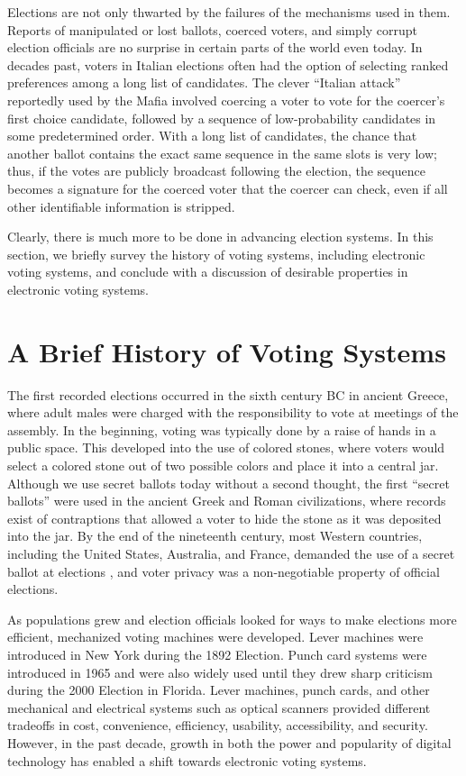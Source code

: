 Elections are not only thwarted by the failures of the mechanisms used in them. Reports of manipulated or lost ballots, coerced voters, and simply corrupt election officials are no surprise in certain parts of the world even today. In decades past, voters in Italian elections often had the option of selecting ranked preferences among a long list of candidates. The clever ``Italian attack'' \cite{naish:italian-attack} reportedly used by the Mafia involved coercing a voter to vote for the coercer's first choice candidate, followed by a sequence of low-probability candidates in some predetermined order. With a long list of candidates, the chance that another ballot contains the exact same sequence in the same slots is very low; thus, if the votes are publicly broadcast following the election, the sequence becomes a signature for the coerced voter that the coercer can check, even if all other identifiable information is stripped.

Clearly, there is much more to be done in advancing election systems. In this section, we briefly survey the history of voting systems, including electronic voting systems, and conclude with a discussion of desirable properties in electronic voting systems.

\section{A Brief History of Voting Systems} \label{intro:history}

The first recorded elections occurred in the sixth century BC in ancient Greece, where adult males were charged with the responsibility to vote at meetings of the assembly. In the beginning, voting was typically done by a raise of hands in a public space. This developed into the use of colored stones, where voters would select a colored stone out of two possible colors and place it into a central jar. Although we use secret ballots today without a second thought, the first ``secret ballots'' were used in the ancient Greek and Roman civilizations, where records exist of contraptions that allowed a voter to hide the stone as it was deposited into the jar. By the end of the nineteenth century, most Western countries, including the United States, Australia, and France, demanded the use of a secret ballot at elections \cite{wiki:secret-ballot}, and voter privacy was a non-negotiable property of official elections.

As populations grew and election officials looked for ways to make elections more efficient, mechanized voting machines were developed. Lever machines were introduced in New York during the 1892 Election. Punch card systems were introduced in 1965 and were also widely used until they drew sharp criticism during the 2000 Election in Florida. Lever machines, punch cards, and other mechanical and electrical systems such as optical scanners provided different tradeoffs in cost, convenience, efficiency, usability, accessibility, and security. However, in the past decade, growth in both the power and popularity of digital technology has enabled a shift towards electronic voting systems.

